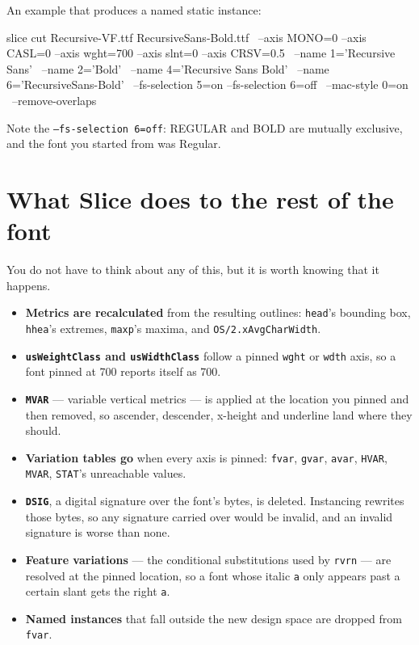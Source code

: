 \documentclass[11pt,a4paper]{article}
\begin{document}
An example that produces a named static instance:

\begin{code}
slice cut Recursive-VF.ttf RecursiveSans-Bold.ttf \
    --axis MONO=0 --axis CASL=0 --axis wght=700 --axis slnt=0 --axis CRSV=0.5 \
    --name 1='Recursive Sans' \
    --name 2='Bold' \
    --name 4='Recursive Sans Bold' \
    --name 6='RecursiveSans-Bold' \
    --fs-selection 5=on --fs-selection 6=off \
    --mac-style 0=on \
    --remove-overlaps
\end{code}

Note the \texttt{--fs-selection 6=off}: REGULAR and BOLD are mutually exclusive, and the font you started from was Regular.

\section{What Slice does to the rest of the font}

You do not have to think about any of this, but it is worth knowing that it happens.

\begin{itemize}
  \item \textbf{Metrics are recalculated} from the resulting outlines: \texttt{head}'s bounding box, \texttt{hhea}'s extremes, \texttt{maxp}'s maxima, and \texttt{OS/2.xAvgCharWidth}.
  \item \textbf{\texttt{usWeightClass} and \texttt{usWidthClass}} follow a pinned \texttt{wght} or \texttt{wdth} axis, so a font pinned at 700 reports itself as 700.
  \item \textbf{\texttt{MVAR}} --- variable vertical metrics --- is applied at the location you pinned and then removed, so ascender, descender, x-height and underline land where they should.
  \item \textbf{Variation tables go} when every axis is pinned: \texttt{fvar}, \texttt{gvar}, \texttt{avar}, \texttt{HVAR}, \texttt{MVAR}, \texttt{STAT}'s unreachable values.
  \item \textbf{\texttt{DSIG}}, a digital signature over the font's bytes, is deleted. Instancing rewrites those bytes, so any signature carried over would be invalid, and an invalid signature is worse than none.
  \item \textbf{Feature variations} --- the conditional substitutions used by \texttt{rvrn} --- are resolved at the pinned location, so a font whose italic \texttt{a} only appears past a certain slant gets the right \texttt{a}.
  \item \textbf{Named instances} that fall outside the new design space are dropped from \texttt{fvar}.
\end{itemize}
\end{document}
